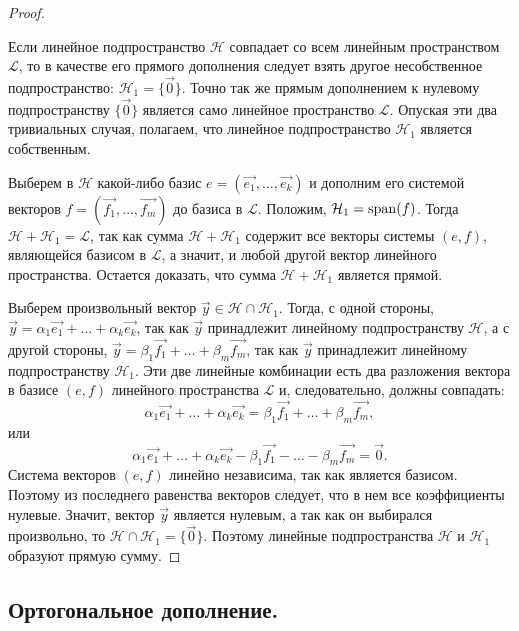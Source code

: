 \begin{proof}~

    Если линейное подпространство $\mathcal{H}$  совпадает со всем линейным пространством $\mathcal{L}$, то в качестве его прямого дополнения следует взять другое несобственное подпространство: $\mathcal{H}_1 = \{\vec{0}\}$. Точно так же прямым дополнением к нулевому подпространству $\{\vec{0}\}$ является само линейное пространство $\mathcal{L}$. Опуская эти два тривиальных случая, полагаем, что линейное подпространство $\mathcal{H}_1$ является собственным.

    Выберем в $\mathcal{H}$ какой-либо базис $e = (\vec{e_1}, \ldots, \vec{e_k})$ и дополним его системой векторов $f = (\vec{f_1}, \ldots, \vec{f_m})$ до базиса в $\mathcal{L}$. Положим, $\mathcal{H}_1 = \operatorname{\mathop{\mathrm{span}}}(f)$. Тогда $\mathcal{H} + \mathcal{H}_1 = \mathcal{L}$, так как сумма $\mathcal{H} + \mathcal{H}_1$ содержит все векторы системы $(e, f)$, являющейся базисом в $\mathcal{L}$, а значит, и любой другой вектор линейного пространства. Остается доказать, что сумма $\mathcal{H} + \mathcal{H}_1$ является прямой.

    Выберем произвольный вектор $\vec{y} \in \mathcal{H} \cap \mathcal{H}_1$. Тогда, с одной стороны, $\vec{y} = \alpha_1\vec{e_1} + \ldots + \alpha_k\vec{e_k}$, так как $\vec{y}$ принадлежит линейному подпространству $\mathcal{H}$, а с другой стороны, $\vec{y} = \beta_1\vec{f_1} + \ldots + \beta_m\vec{f_m}$, так как $\vec{y}$ принадлежит линейному подпространству $\mathcal{H}_1$. Эти две линейные комбинации есть два разложения вектора в базисе $(e, f)$ линейного пространства $\mathcal{L}$ и, следовательно, должны совпадать:
    $$\alpha_1\vec{e_1} + \ldots + \alpha_k\vec{e_k} = \beta_1\vec{f_1} + \ldots + \beta_m\vec{f_m},$$
    или
    $$\alpha_1\vec{e_1} + \ldots + \alpha_k\vec{e_k} - \beta_1\vec{f_1} - \ldots - \beta_m\vec{f_m} = \vec{0}.$$
    Система векторов $(e, f)$ линейно независима, так как является базисом. Поэтому из последнего равенства векторов следует, что в нем все коэффициенты нулевые. Значит, вектор $\vec{y}$ является нулевым, а так как он выбирался произвольно, то $\mathcal{H} \cap \mathcal{H}_1 = \{\vec{0}\}$. Поэтому линейные подпространства $\mathcal{H}$ и $\mathcal{H}_1$ образуют прямую сумму.
\end{proof}


\newpage


\subsection{
    Ортогональное дополнение.
}

